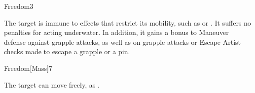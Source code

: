 \begin{spellsection}{Freedom}{3}
    \begin{spellheader}
    \end{spellheader}
    \begin{spellcontent}
        \begin{spelltargetinginfo}
        \end{spelltargetinginfo}
        \begin{spelleffects}
            \spelleffect The target is immune to effects that restrict its mobility, such as  or . It suffers no penalties for acting underwater. In addition, it gains a  bonus to Maneuver defense against grapple attacks, as well as on grapple attacks or Escape Artist checks made to escape a grapple or a pin.
            \spelldur \durshort
        \end{spelleffects}
    \end{spellcontent}
    \begin{spellfooter}
        \miscastrandom
    \end{spellfooter}
\end{spellsection}

\begin{spellsection}{Freedom}[Mass]{7}
    \begin{spellheader}
    \end{spellheader}
    \begin{spellcontent}
        \begin{spelltargetinginfo}
        \end{spelltargetinginfo}
        \begin{spelleffects}
            \spelleffect The target can move freely, as .
            \spelldur \durshort
        \end{spelleffects}
    \end{spellcontent}
    \begin{spellfooter}
        \miscastexplode
    \end{spellfooter}
\end{spellsection}


